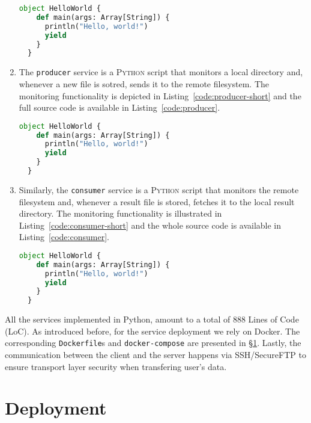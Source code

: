 \begin{enumerate}
\begin{lstlisting}[language=Python,caption={Snippet illustrating the data gathering and file generation in the \texttt{mqtt-subscriber} service.},label=code:mqtt-sub-short]
 object HelloWorld {
    def main(args: Array[String]) {
      println("Hello, world!")
      yield
    }
  }
\end{lstlisting}
    \item The \texttt{producer} service is a \textsc{Python} script that monitors a local directory and, whenever a new file is sotred, sends it to the remote filesystem. The monitoring functionality is depicted in Listing~\ref{code:producer-short} and the full source code is available in Listing~\ref{code:producer}.
\begin{lstlisting}[language=Python,caption={Snippet illustrating the local directory monitoring in the \texttt{producer} service.},label=code:producer-short]
 object HelloWorld {
    def main(args: Array[String]) {
      println("Hello, world!")
      yield
    }
  }
\end{lstlisting}
    \item Similarly, the \texttt{consumer} service is a \textsc{Python} script that monitors the remote filesystem and, whenever a result file is stored, fetches it to the local result directory. The monitoring functionality is illustrated in Listing~\ref{code:consumer-short} and the whole source code is available in Listing~\ref{code:consumer}.
\begin{lstlisting}[language=Python,caption={Snippet illustrating the remote filesystem monitoring in the \texttt{consumer} service.},label=code:producer-short]
 object HelloWorld {
    def main(args: Array[String]) {
      println("Hello, world!")
      yield
    }
  }
\end{lstlisting}
\end{enumerate}
All the services implemented in Python, amount to a total of $888$ Lines of Code (LoC). 
As introduced before, for the service deployment we rely on Docker.
The corresponding \texttt{Dockerfile}s and \texttt{docker-compose} are presented in \S\ref{sec:deployment}.
Lastly, the communication between the client and the server happens via SSH/SecureFTP to ensure transport layer security when transfering user's data.

\section{Deployment} \label{sec:deployment}

